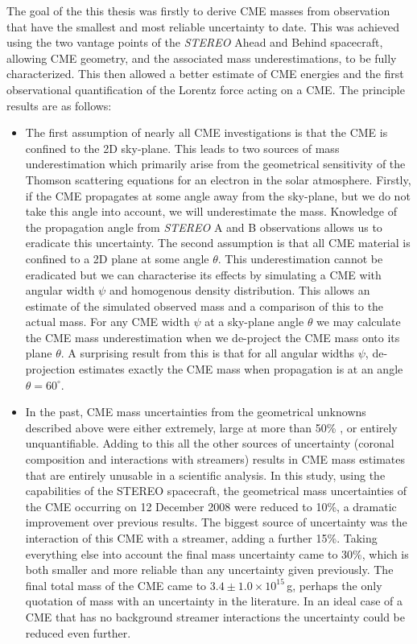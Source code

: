 The goal of the this thesis was firstly to derive CME masses from observation that have the smallest and most reliable uncertainty to date. This was achieved using the two vantage points of the \emph{STEREO} Ahead and Behind spacecraft, allowing CME geometry, and the associated mass underestimations, to be fully characterized. This then allowed a better estimate of CME energies and the first observational quantification of the Lorentz force acting on a CME. The principle results are as follows:
\begin{itemize}
\item The first assumption of nearly all CME investigations is that the CME is confined to the 2D sky-plane. This leads to two sources of mass underestimation which primarily arise from the geometrical sensitivity of the Thomson scattering equations for an electron in the solar atmosphere. Firstly, if the CME propagates at some angle away from the sky-plane, but we do not take this angle into account, we will underestimate the mass. Knowledge of the propagation angle from \emph{STEREO} A and B observations allows us to eradicate this uncertainty. The second assumption is that all CME material is confined to a 2D plane at some angle $\theta$. This underestimation cannot be eradicated but we can characterise its effects by simulating a CME with angular width $\psi$ and homogenous density distribution. This allows an estimate of the simulated observed mass and a comparison of this to the actual mass. For any CME width $\psi$ at a sky-plane angle $\theta$ we may calculate the CME mass underestimation when we de-project the CME mass onto its plane $\theta$. A surprising result from this is that for all angular widths $\psi$, de-projection estimates exactly the CME mass when propagation is at an angle $\theta=60^{\circ}$.

\item In the past, CME mass uncertainties from the geometrical unknowns described above were either extremely, large at more than 50\% \citep{vou00}, or entirely unquantifiable. Adding to this all the other sources of uncertainty (coronal composition and interactions with streamers) results in CME mass estimates that are entirely unusable in a scientific analysis. In this study, using the capabilities of the STEREO spacecraft, the geometrical mass uncertainties of the CME occurring on 12 December 2008 were reduced to 10\%, a dramatic improvement over previous results. The biggest source of uncertainty was the interaction of this CME with a streamer, adding a further 15\%. Taking everything else into account the final mass uncertainty came to 30\%, which is both smaller and more reliable than any uncertainty given previously. The final total mass of the CME came to
$3.4\pm1.0\times10^{15}$\,g, perhaps the only quotation of mass with an uncertainty in the literature. In an ideal case of a CME that has no background streamer interactions the uncertainty could be reduced even further.


\end{itemize}
